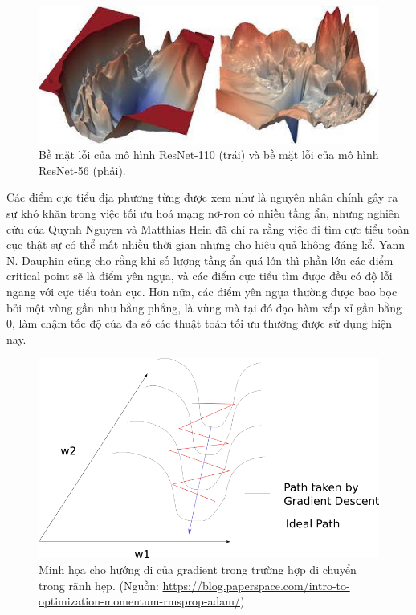 \begin{figure}[htp]
	\centering
	\includegraphics[width=120 mm]{images/resnet-loss.png}
	\caption{Bề mặt lỗi của mô hình ResNet-110 (trái) và bề mặt lỗi của mô hình ResNet-56 (phải).\cite{li2018visualizing}}
	\label{fig:resnet-loss}
\end{figure}

Các điểm cực tiểu địa phương từng được xem như là nguyên nhân chính gây ra sự khó khăn trong việc tối ưu hoá mạng nơ-ron có nhiều tầng ẩn, nhưng nghiên cứu của Quynh Nguyen và Matthias Hein\cite{nguyen2017thelosssurface} đã chỉ ra rằng việc đi tìm cực tiểu toàn cục thật sự có thể mất nhiều thời gian nhưng cho hiệu quả không đáng kể. Yann N. Dauphin cũng cho rằng khi số lượng tầng ẩn quá lớn thì phần lớn các điểm critical point sẽ là điểm yên ngựa, và các điểm cực tiểu tìm được đều có độ lỗi ngang với cực tiểu toàn cục. Hơn nữa, các điểm yên ngựa thường được bao bọc bởi một vùng gần như bằng phẳng, là vùng mà tại đó đạo hàm xấp xỉ gần bằng 0, làm chậm tốc độ của đa số các thuật toán tối ưu thường được sử dụng hiện nay.

\begin{figure}[htp]
	\centering
	\includegraphics[width=100 mm]{images/valley.png}
	\caption{Minh họa cho hướng đi của gradient trong trường hợp di chuyển trong rãnh hẹp. (Nguồn: \url{https://blog.paperspace.com/intro-to-optimization-momentum-rmsprop-adam/})}
	\label{fig:valley}
\end{figure}

